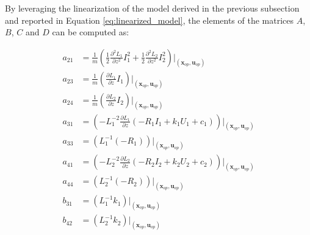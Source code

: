 By leveraging the linearization of the model derived in the previous subsection and reported in Equation \ref{eq:linearized_model}, the elements of the matrices $A$, $B$, $C$ and $D$ can be computed as:

\begin{equation}
    \begin{aligned}
        a_{21} & = \frac{1}{m} \left( \frac{1}{2} \frac{\partial^2 L_1}{\partial z^2} I_1^2 + \frac{1}{2} \frac{\partial^2 L_2}{\partial z^2} I_{2}^2 \right) \bigg|_{(\mathbf{x}_{op}, \mathbf{u}_{op})} \\
        a_{23} & = \frac{1}{m} \left( \frac{\partial L_1}{\partial z} I_1\right) \bigg|_{(\mathbf{x}_{op}, \mathbf{u}_{op})}                                                                              \\
        a_{24} & = \frac{1}{m} \left( \frac{\partial L_2}{\partial z} I_2\right) \bigg|_{(\mathbf{x}_{op}, \mathbf{u}_{op})}                                                                              \\
        a_{31} & = \left(- L_1^{-2} \frac{\partial L_1}{\partial z} \left(- R_1 I_1 + k_1 U_1 + c_1 \right) \right) \bigg|_{(\mathbf{x}_{op}, \mathbf{u}_{op})}                                           \\
        a_{33} & = \left(L_1^{-1} (-R_1) \right) \big|_{(\mathbf{x}_{op}, \mathbf{u}_{op})}                                                                                                               \\
        a_{41} & = \left(- L_2^{-2} \frac{\partial L_2}{\partial z} \left(- R_2 I_2 + k_2 U_2 + c_2 \right) \right) \bigg|_{(\mathbf{x}_{op}, \mathbf{u}_{op})}                                           \\
        a_{44} & = \left(L_2^{-1} (-R_2) \right) \big|_{(\mathbf{x}_{op}, \mathbf{u}_{op})}                                                                                                               \\
        b_{31} & = \left(L_1^{-1} k_1 \right) \big|_{(\mathbf{x}_{op}, \mathbf{u}_{op})}                                                                                                                  \\
        b_{42} & = \left(L_2^{-1} k_2 \right) \big|_{(\mathbf{x}_{op}, \mathbf{u}_{op})}
    \end{aligned}
\end{equation}


